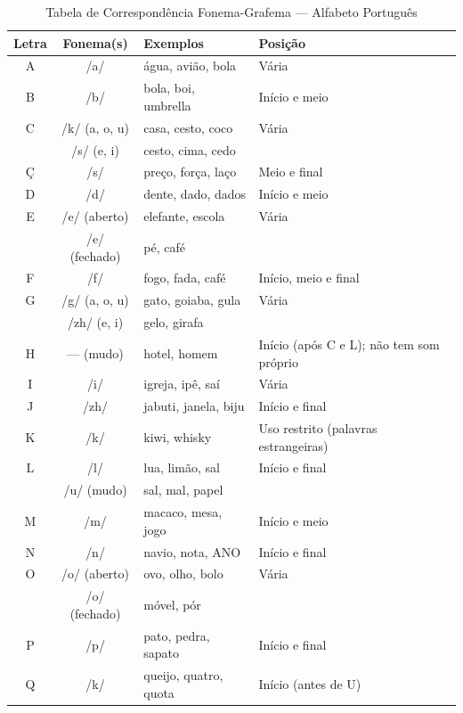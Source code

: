 \begin{table}[h]
\centering
\caption{Tabela de Correspondência Fonema-Grafema --- Alfabeto Português}
\label{tab:fonema-grafema}
\renewcommand{\arraystretch}{1.25}
\begin{tabular}{|c|c|p{3.5cm}|p{3.5cm}|}
\hline
\textbf{Letra} & \textbf{Fonema(s)} & \textbf{Exemplos} & \textbf{Posição} \\
\hline
A & /a/ & água, avião, bola & V\'{a}ria \\
\hline
B & /b/ & bola, boi, umbrella & In\'{i}cio e meio \\
\hline
C & /k/ (a, o, u) & casa, cesto, coco & V\'{a}ria \\
  & /s/ (e, i) & cesto, cima, cedo & \\
\hline
Ç & /s/ & preço, força, laço & Meio e final \\
\hline
D & /d/ & dente, dado, dados & In\'{i}cio e meio \\
\hline
E & /e/ (aberto) & elefante, escola & V\'{a}ria \\
  & /e/ (fechado) & pé, café & \\
\hline
F & /f/ & fogo, fada, café & In\'{i}cio, meio e final \\
\hline
G & /g/ (a, o, u) & gato, goiaba, gula & V\'{a}ria \\
  & /zh/ (e, i) & gelo, girafa & \\
\hline
H & --- (mudo) & hotel, homem & In\'{i}cio (ap\'{o}s C e L);
n\~{a}o tem som pr\'{o}prio \\
\hline
I & /i/ & igreja, ipê, saí & V\'{a}ria \\
\hline
J & /zh/ & jabuti, janela, biju & In\'{i}cio e final \\
\hline
K & /k/ & kiwi, whisky & Uso restrito (palavras estrangeiras) \\
\hline
L & /l/ & lua, limão, sal & In\'{i}cio e final \\
  & /u/ (mudo) & sal, mal, papel & \\
\hline
M & /m/ & macaco, mesa, jogo & In\'{i}cio e meio \\
\hline
N & /n/ & navio, nota, ANO & In\'{i}cio e final \\
\hline
O & /o/ (aberto) & ovo, olho, bolo & V\'{a}ria \\
  & /o/ (fechado) & m\'{o}vel, p\'{o}r & \\
\hline
P & /p/ & pato, pedra, sapato & In\'{i}cio e final \\
\hline
Q & /k/ & queijo, quatro, quota & In\'{i}cio (antes de U) \\

\end{tabular}
\end{table}
